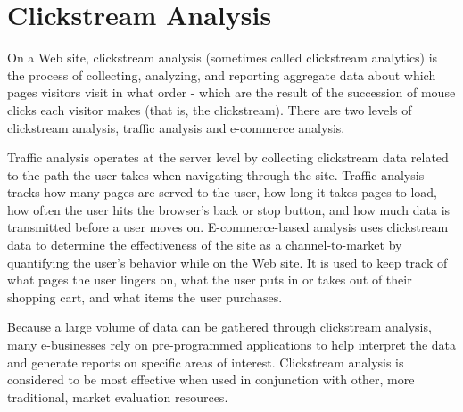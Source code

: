 \section{Clickstream Analysis}

On a Web site, clickstream analysis (sometimes called clickstream analytics) is the process of collecting, analyzing, and reporting aggregate data about which pages visitors visit in what order - which are the result of the succession of mouse clicks each visitor makes (that is, the clickstream). There are two levels of clickstream analysis, traffic analysis and e-commerce analysis.

Traffic analysis operates at the server level by collecting clickstream data related to the path the user takes when navigating through the site. Traffic analysis tracks how many pages are served to the user, how long it takes pages to load, how often the user hits the browser's back or stop button, and how much data is transmitted before a user moves on. E-commerce-based analysis uses clickstream data to determine the effectiveness of the site as a channel-to-market by quantifying the user's behavior while on the Web site. It is used to keep track of what pages the user lingers on, what the user puts in or takes out of their shopping cart, and what items the user purchases.

Because a large volume of data can be gathered through clickstream analysis, many e-businesses rely on pre-programmed applications to help interpret the data and generate reports on specific areas of interest. Clickstream analysis is considered to be most effective when used in conjunction with other, more traditional, market evaluation resources.
